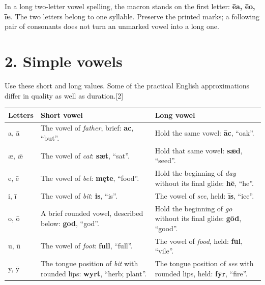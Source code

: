 In a long two-letter vowel spelling, the macron stands on the first letter: \textbf{ēa, ēo, īe}. The two letters belong to one syllable. Preserve the printed marks; a following pair of consonants does not turn an unmarked vowel into a long one.

\section*{2. Simple vowels}

Use these short and long values. Some of the practical English approximations differ in quality as well as duration.[2]

\par\begingroup
\fontsize{10.5}{13.2}\selectfont
\setlength{\LTleft}{0pt}\setlength{\LTright}{\fill}
\noindent
\begin{tabular}{@{}>{\raggedright\arraybackslash}p{15.099mm}>{\raggedright\arraybackslash}p{52.318mm}>{\raggedright\arraybackslash}p{50.959mm}@{}}
\toprule
\textbf{Letters} & \textbf{Short vowel} & \textbf{Long vowel} \\
\midrule
a, ā & The vowel of \emph{father}, brief: \textbf{ac}, “but”. & Hold the same vowel: \textbf{āc}, “oak”. \\
æ, ǣ & The vowel of \emph{cat}: \textbf{sæt}, “sat”. & Hold that same vowel: \textbf{sǣd}, “seed”. \\
e, ē & The vowel of \emph{bet}: \textbf{męte}, “food”. & Hold the beginning of \emph{day} without its final glide: \textbf{hē}, “he”. \\
i, ī & The vowel of \emph{bit}: \textbf{is}, “is”. & The vowel of \emph{see}, held: \textbf{īs}, “ice”. \\
o, ō & A brief rounded vowel, described below: \textbf{god}, “god”. & Hold the beginning of \emph{go} without its final glide: \textbf{gōd}, “good”. \\
u, ū & The vowel of \emph{foot}: \textbf{full}, “full”. & The vowel of \emph{food}, held: \textbf{fūl}, “vile”. \\
y, ȳ & The tongue position of \emph{bit} with rounded lips: \textbf{wyrt}, “herb; plant”. & The tongue position of \emph{see} with rounded lips, held: \textbf{fȳr}, “fire”. \\
\bottomrule
\end{tabular}
\par\endgroup

